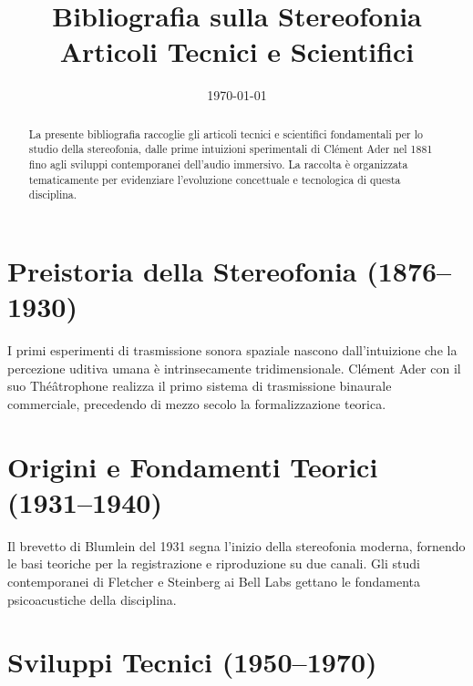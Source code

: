 \documentclass[11pt,a4paper]{article}
\title{Bibliografia sulla Stereofonia\\Articoli Tecnici e Scientifici}
\author{}
\date{\today}
\begin{document}
\maketitle

\begin{abstract}
La presente bibliografia raccoglie gli articoli tecnici e scientifici fondamentali per lo studio della stereofonia, dalle prime intuizioni sperimentali di Clément Ader nel 1881 fino agli sviluppi contemporanei dell'audio immersivo. La raccolta è organizzata tematicamente per evidenziare l'evoluzione concettuale e tecnologica di questa disciplina.
\end{abstract}

\section{Preistoria della Stereofonia (1876--1930)}

I primi esperimenti di trasmissione sonora spaziale nascono dall'intuizione che la percezione uditiva umana è intrinsecamente tridimensionale. Clément Ader con il suo Théâtrophone realizza il primo sistema di trasmissione binaurale commerciale, precedendo di mezzo secolo la formalizzazione teorica.

\nocite{bell1877}
\nocite{edison1877}
\nocite{dolbear1879}
\nocite{preece1879}
\nocite{ader1881}
\nocite{ader1881patent}
\nocite{du_moncel1882}
\nocite{tainter1886}
\nocite{berliner1888}
\nocite{bartok1889}
\nocite{hospitalier1889}
\nocite{puskas1893}
\nocite{hunnings1899}
\nocite{koenig1899}
\nocite{electrician1925}
\nocite{fletcher1928}
\nocite{steinberg1929}
\nocite{wente1930}

\section{Origini e Fondamenti Teorici (1931--1940)}

Il brevetto di Blumlein del 1931 segna l'inizio della stereofonia moderna, fornendo le basi teoriche per la registrazione e riproduzione su due canali. Gli studi contemporanei di Fletcher e Steinberg ai Bell Labs gettano le fondamenta psicoacustiche della disciplina.

\nocite{blumlein1931}
\nocite{fletcher1934}
\nocite{steinberg1934}

\section{Sviluppi Tecnici (1950--1970)}
\end{document}
